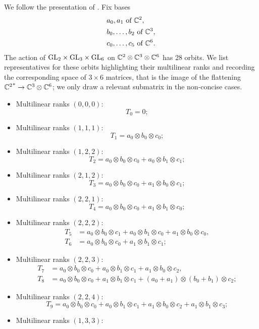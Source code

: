 We follow the presentation of \cite[Sec. 10.3]{Lan12}. Fix bases 
\begin{align*}
&a_0,a_1 \text { of } \mathbb{C}^2, \\
&b_0, \ldots , b_2 \text{ of } \mathbb{C}^3, \\ 
&c_0, \ldots , c_5 \text{ of } \mathbb{C}^6. \\ 
\end{align*}
The action of $\mathrm{GL}_2 \times \mathrm{GL}_3 \times \mathrm{GL}_6$ on $\mathbb{C}^2 \otimes \mathbb{C}^3 \otimes \mathbb{C}^6$ has $28$ orbits. We list representatives for these orbits highlighting their multilinear ranks and recording the corresponding space of $3 \times 6$ matrices, that is the image of the flattening ${\mathbb{C}^2}^* \to \mathbb{C}^3 \otimes \mathbb{C}^6$; we only draw a relevant submatrix in the non-concise cases.

\begin{itemize}
 \item Multilinear ranks $(0,0,0)$: 
 \[
  T_0 = 0;
 \]
\item Multilinear ranks $(1,1,1)$:
\[
T_1 = a_0 \otimes b_0 \otimes c_0;
\]
\item Multilinear ranks $(1,2,2)$:
\[
T_2 = a_0 \otimes b_0 \otimes c_0 + a_0 \otimes b_1 \otimes c_1;
\]
\item Multilinear ranks $(2,1,2)$:
\[
T_3 = a_0 \otimes b_0 \otimes c_0 + a_1 \otimes b_0 \otimes c_1;
\]
\item Multilinear ranks $(2,2,1)$:
\[
T_4 = a_0 \otimes b_0 \otimes c_0 + a_1 \otimes b_1 \otimes c_0;
\]
\item Multilinear ranks $(2,2,2)$:
\begin{align*}
T_5 &= a_0 \otimes b_0 \otimes c_1 + a_0 \otimes b_1 \otimes c_0 + a_1 \otimes b_0 \otimes c_0, \\
T_6 &= a_0 \otimes b_0 \otimes c_0 + a_1 \otimes b_1 \otimes c_1;
\end{align*}
\item Multilinear ranks $(2,2,3)$:
\begin{align*}
T_7 &= a_0 \otimes b_0 \otimes c_0 + a_0 \otimes b_1 \otimes c_1 + a_1 \otimes b_0 \otimes c_2, \\
T_8 &= a_0 \otimes b_0 \otimes c_0 + a_1 \otimes b_1 \otimes c_1 + (a_0 + a_1) \otimes (b_0 + b_1) \otimes c_2;
\end{align*}
\item Multilinear ranks $(2,2,4)$:
\[
T_9 = a_0 \otimes b_0 \otimes c_0 + a_0 \otimes b_1 \otimes c_1 + a_1 \otimes b_0 \otimes c_2 + a_1 \otimes b_1 \otimes c_3;
\]
\item Multilinear ranks $(1,3,3)$:

\end{itemize}
